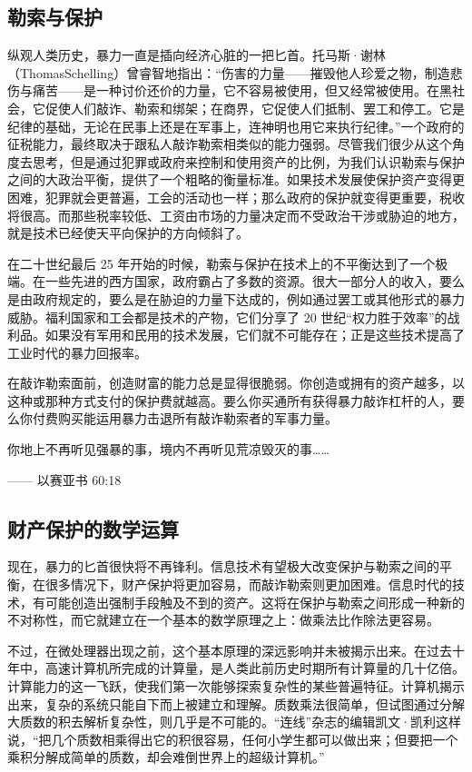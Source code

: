 \subsection{勒索与保护}
纵观人类历史，暴力一直是插向经济心脏的一把匕首。托马斯·谢林（ThomasSchelling）曾睿智地指出：“伤害的力量——摧毁他人珍爱之物，制造悲伤与痛苦——是一种讨价还价的力量，它不容易被使用，但又经常被使用。在黑社会，它促使人们敲诈、勒索和绑架；在商界，它促使人们抵制、罢工和停工。它是纪律的基础，无论在民事上还是在军事上，连神明也用它来执行纪律。”一个政府的征税能力，最终取决于跟私人敲诈勒索相类似的能力强弱。尽管我们很少从这个角度去思考，但是通过犯罪或政府来控制和使用资产的比例，为我们认识勒索与保护之间的大政治平衡，提供了一个粗略的衡量标准。如果技术发展使保护资产变得更困难，犯罪就会更普遍，工会的活动也一样；那么政府的保护就变得更重要，税收将很高。而那些税率较低、工资由市场的力量决定而不受政治干涉或胁迫的地方，就是技术已经使天平向保护的方向倾斜了。

在二十世纪最后 25 年开始的时候，勒索与保护在技术上的不平衡达到了一个极端。在一些先进的西方国家，政府霸占了多数的资源。很大一部分人的收入，要么是由政府规定的，要么是在胁迫的力量下达成的，例如通过罢工或其他形式的暴力威胁。福利国家和工会都是技术的产物，它们分享了 20 世纪“权力胜于效率”的战利品。如果没有军用和民用的技术发展，它们就不可能存在；正是这些技术提高了工业时代的暴力回报率。

在敲诈勒索面前，创造财富的能力总是显得很脆弱。你创造或拥有的资产越多，以这种或那种方式支付的保护费就越高。要么你买通所有获得暴力敲诈杠杆的人，要么你付费购买能运用暴力击退所有敲诈勒索者的军事力量。


\begin{tcolorbox}
你地上不再听见强暴的事，境内不再听见荒凉毁灭的事……
\begin{flushright}
—— 以赛亚书 60:18
\end{flushright}
\end{tcolorbox}

\subsection{财产保护的数学运算}
现在，暴力的匕首很快将不再锋利。信息技术有望极大改变保护与勒索之间的平衡，在很多情况下，财产保护将更加容易，而敲诈勒索则更加困难。信息时代的技术，有可能创造出强制手段触及不到的资产。这将在保护与勒索之间形成一种新的不对称性，而它就建立在一个基本的数学原理之上：做乘法比作除法更容易。

不过，在微处理器出现之前，这个基本原理的深远影响并未被揭示出来。在过去十年中，高速计算机所完成的计算量，是人类此前历史时期所有计算量的几十亿倍。计算能力的这一飞跃，使我们第一次能够探索复杂性的某些普遍特征。计算机揭示出来，复杂的系统只能自下而上被建立和理解。质数乘法很简单，但试图通过分解大质数的积去解析复杂性，则几乎是不可能的。“连线”杂志的编辑凯文·凯利这样说，“把几个质数相乘得出它的积很容易，任何小学生都可以做出来；但要把一个乘积分解成简单的质数，却会难倒世界上的超级计算机。”

